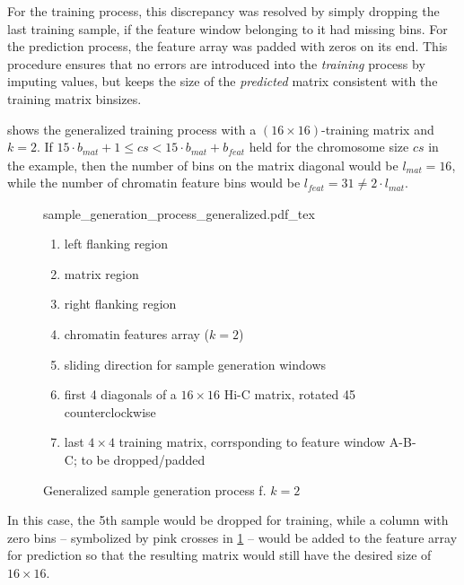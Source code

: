 For the training process, this discrepancy was resolved by simply dropping the last training sample, 
if the feature window belonging to it had missing bins.
For the prediction process, the feature array was padded with zeros on its end.
This procedure ensures that no errors are introduced into the \emph{training} process by imputing values,
but keeps the size of the \emph{predicted} matrix consistent with the training matrix binsizes.

 shows the generalized training process with a $(16\times16)$-training matrix and $k=2$. 
If  $15\cdot b_\mathit{mat} + 1 \leq cs < 15\cdot b_\mathit{mat} + b_\mathit{feat}$ held for the chromosome size $cs$ in the example,
then the number of bins on the matrix diagonal would be $l_\mathit{mat}=16$, while the number of chromatin feature bins would be $l_\mathit{feat}=31 \not = 2 \cdot l_\mathit{mat}$.
\begin{figure}
 \begin{minipage}{0.60\textwidth}
   \centering
    \small
    {sample_generation_process_generalized.pdf_tex}
    \caption{Generalized sample generation process f. $k=2$}
    \label{fig:methods:sample_gen_generalized}
 \end{minipage}\hfill
 \begin{minipage}{0.3\textwidth}
 \scriptsize
  \begin{enumerate}[label=\Alph*:,leftmargin=*]
   \raggedright
    \item left flanking region
    \item matrix region
    \item right flanking region
    \item chromatin features array ($k=2$)
    \item sliding direction for sample generation windows
    \item first 4 diagonals of a $16\times16$ Hi-C matrix, rotated \SI{45}{\deg} counterclockwise
    \item last $4\times4$ training matrix, corrsponding to feature window A-B-C; to be dropped/padded
\end{enumerate}
 \end{minipage}
\end{figure}
In this case, the 5th sample would be dropped for training,
while a column with zero bins -- symbolized by pink crosses in \cref{fig:methods:sample_gen_generalized} -- would be added to the feature array for prediction
so that the resulting matrix would still have the desired size of $16 \times 16$.

